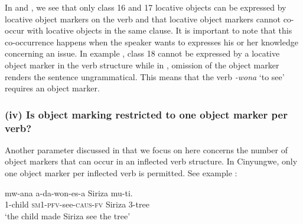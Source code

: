 \documentclass[output=paper]{langscibook}
\begin{document}


\z
\z

In  and , we see that only class 16 and 17 locative objects can be expressed by locative object markers on the verb and that locative object markers cannot co-occur with locative objects in the same clause. It is important to note that this co-occurrence happens when the speaker wants to expresses his or her knowledge concerning an issue. In example , class 18 cannot be expressed by a locative object marker in the verb structure while in , omission of the object marker renders the sentence ungrammatical. This means that the verb \textit{{}-wona} ‘to see’ requires an object marker. 

\subsubsection{(iv) Is object marking restricted to one object marker per verb?}

Another parameter discussed in \citet{MartenKula2012} that we focus on here concerns the number of object markers that can occur in an inflected verb structure. In Cinyungwe, only one object marker per inflected verb is permitted. See example :

\ea\label{ex:ngunga:27}
\ea\label{ex:ngunga:27a} \gll  mw-ana  a-da-won-es-a    Siriza  mu-ti.\\
  {\textsc{}1}{}-child  {\textsc{sm1}-\textsc{pfv}}{}-see-{\textsc{caus}}{}-{\textsc{fv}}  Siriza  3-tree\\
\glt  ‘the child made Siriza see the tree’    
\end{document}
